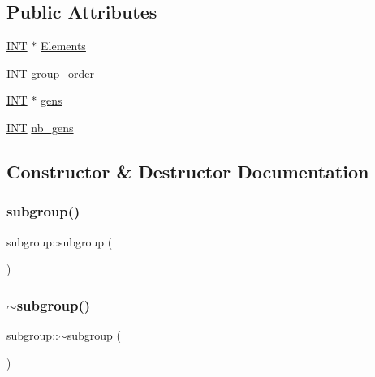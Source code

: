 \subsection*{Public Attributes}
\begin{DoxyCompactItemize}
\item 
\mbox{\hyperlink{galois_8h_a09fddde158a3a20bd2dcadb609de11dc}{I\+NT}} $\ast$ \mbox{\hyperlink{classsubgroup_a82c231e10723e796ad47411c8948cdbb}{Elements}}
\item 
\mbox{\hyperlink{galois_8h_a09fddde158a3a20bd2dcadb609de11dc}{I\+NT}} \mbox{\hyperlink{classsubgroup_acb55a787275d4983e8a3f9ae5a1007fb}{group\+\_\+order}}
\item 
\mbox{\hyperlink{galois_8h_a09fddde158a3a20bd2dcadb609de11dc}{I\+NT}} $\ast$ \mbox{\hyperlink{classsubgroup_a8210a28fdd7e9f648f8b7ea37b84ade5}{gens}}
\item 
\mbox{\hyperlink{galois_8h_a09fddde158a3a20bd2dcadb609de11dc}{I\+NT}} \mbox{\hyperlink{classsubgroup_aff3a1e4d5c8dd46d159296a5c49e86e4}{nb\+\_\+gens}}
\end{DoxyCompactItemize}


\subsection{Constructor \& Destructor Documentation}
\mbox{\label{classsubgroup_ad39c9ae2b8141ef1edbd4e1dd9bf6ae3}} 
\subsubsection{\texorpdfstring{subgroup()}{subgroup()}}
{\footnotesize\ttfamily subgroup\+::subgroup (\begin{DoxyParamCaption}{ }\end{DoxyParamCaption})}

\mbox{\label{classsubgroup_adbfc6bedf6bf5fa72e94852b4647b0c5}} 
\subsubsection{\texorpdfstring{$\sim$subgroup()}{~subgroup()}}
{\footnotesize\ttfamily subgroup\+::$\sim$subgroup (\begin{DoxyParamCaption}{ }\end{DoxyParamCaption})}



